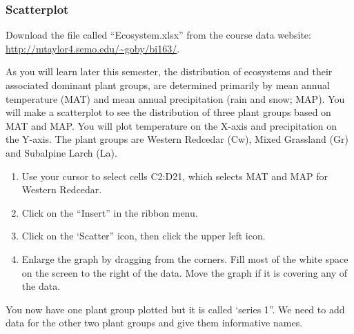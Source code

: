 \documentclass[12pt, hidelinks]{exam}
\newcommand{\VSpace}{\vspace{\baselineskip}}
\begin{document}
\subsubsection*{Scatterplot}

Download the file called “Ecosystem.xlsx” from the course data website: \url{http://mtaylor4.semo.edu/~goby/bi163/}.\VSpace

As you will learn later this semester, the distribution of ecosystems and their associated dominant plant groups, are determined primarily by mean annual temperature (MAT) and mean annual precipitation (rain and snow; MAP). You will make a scatterplot to see the distribution of three plant groups based on MAT and MAP. You will plot temperature on the X-axis and precipitation on the Y-axis. The plant groups are Western Redcedar (Cw), Mixed Grassland (Gr) and Subalpine Larch (La). 

\begin{enumerate}
	\item Use your cursor to select cells C2:D21, which selects MAT and MAP for Western Redcedar.

	\item Click on the “Insert” in the ribbon menu.

	\item Click on the ‘Scatter” icon, then click the upper left icon.

	\item Enlarge the graph by dragging from the corners. Fill most of the white space on the screen to the right of the data. Move the graph if it is covering any of the data. 
\end{enumerate}

You now have one plant group plotted but it is called ‘series 1”. We need to add data for the other two plant groups and give them informative names. 
\end{document}

